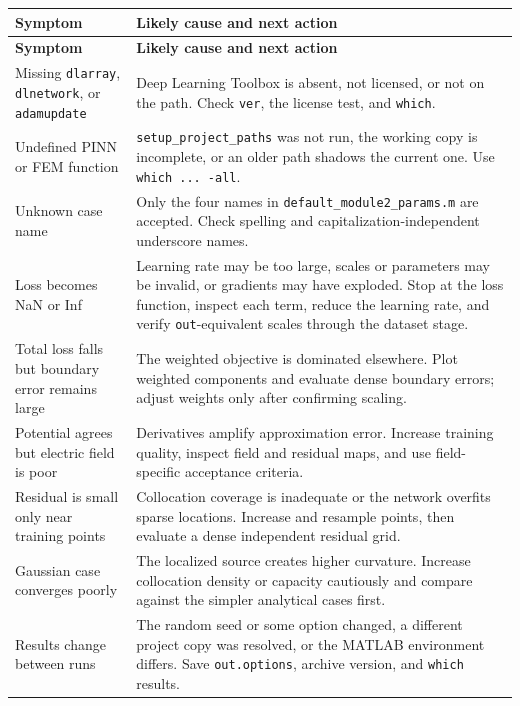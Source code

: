 \documentclass[11pt]{article}
\begin{document}
\begin{longtable}{>{\RaggedRight\arraybackslash}p{} >{\RaggedRight\arraybackslash}p{}}
\toprule
\textbf{Symptom} & \textbf{Likely cause and next action} \\
\midrule
\endfirsthead
\toprule
\textbf{Symptom} & \textbf{Likely cause and next action} \\
\midrule
\endhead
Missing \texttt{dlarray}, \texttt{dlnetwork}, or \texttt{adamupdate} & Deep Learning Toolbox is absent, not licensed, or not on the path. Check \texttt{ver}, the license test, and \texttt{which}. \\
Undefined PINN or FEM function & \texttt{setup\_project\_paths} was not run, the working copy is incomplete, or an older path shadows the current one. Use \texttt{which ... -all}. \\
Unknown case name & Only the four names in \texttt{default\_module2\_params.m} are accepted. Check spelling and capitalization-independent underscore names. \\
Loss becomes NaN or Inf & Learning rate may be too large, scales or parameters may be invalid, or gradients may have exploded. Stop at the loss function, inspect each term, reduce the learning rate, and verify \texttt{out}-equivalent scales through the dataset stage. \\
Total loss falls but boundary error remains large & The weighted objective is dominated elsewhere. Plot weighted components and evaluate dense boundary errors; adjust weights only after confirming scaling. \\
Potential agrees but electric field is poor & Derivatives amplify approximation error. Increase training quality, inspect field and residual maps, and use field-specific acceptance criteria. \\
Residual is small only near training points & Collocation coverage is inadequate or the network overfits sparse locations. Increase and resample points, then evaluate a dense independent residual grid. \\
Gaussian case converges poorly & The localized source creates higher curvature. Increase collocation density or capacity cautiously and compare against the simpler analytical cases first. \\
Results change between runs & The random seed or some option changed, a different project copy was resolved, or the MATLAB environment differs. Save \texttt{out.options}, archive version, and \texttt{which} results. \\

\end{longtable}
\end{document}
